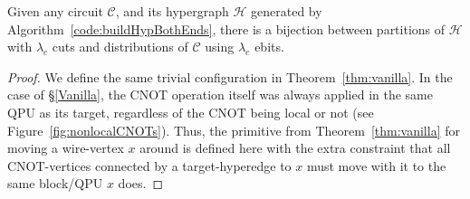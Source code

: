 \begin{theorem}
 Given any circuit \(\mathcal{C}\), and its hypergraph \(\mathcal{H}\) generated by Algorithm~\ref{code:buildHypBothEnds}, there is a bijection between partitions of \(\mathcal{H}\) with \(\lambda_c\) cuts and distributions of \(\mathcal{C}\) using \(\lambda_e\) ebits.
 \label{thm:bothEnds}
\end{theorem}
\begin{proof}
We define the same trivial configuration in Theorem~\ref{thm:vanilla}. In the case of \S\ref{Vanilla}, the CNOT operation itself was always applied in the same QPU as its target, regardless of the CNOT being local or not (see Figure~\ref{fig:nonlocalCNOTs}). Thus, the primitive from Theorem~\ref{thm:vanilla} for moving a wire-vertex \(x\) around is defined here with the extra constraint that all CNOT-vertices connected by a target-hyperedge to \(x\) must move with it to the same block/QPU \(x\) does. 


\end{proof}
